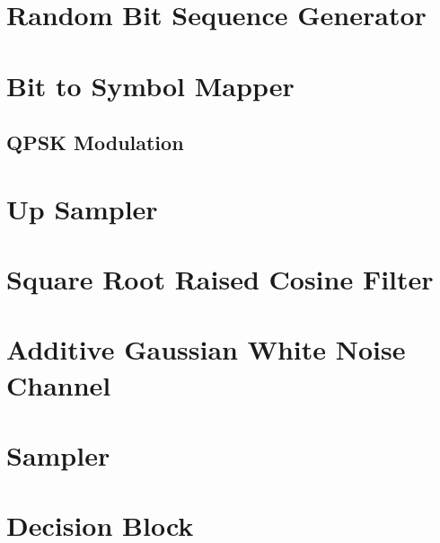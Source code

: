 \documentclass[]{article}
\begin{document}
\appendix
\newpage


\newpage
%

\section{Random Bit Sequence Generator}
\label{app:random_bit_generator}


\section{Bit to Symbol Mapper}
\label{app:bittosym}
\subsection{QPSK Modulation}
\label{app:qpsk_mod}


\section{Up Sampler}
\label{app:impulse_train}


\section{Square Root Raised Cosine Filter}
\label{app:sqrt_raised_cosine}


\section{Additive Gaussian White Noise Channel}
\label{app:awgn_channel}


\section{Sampler}
\label{app:sampler}


\section{Decision Block}
\label{app:dblocks}
\end{document}
